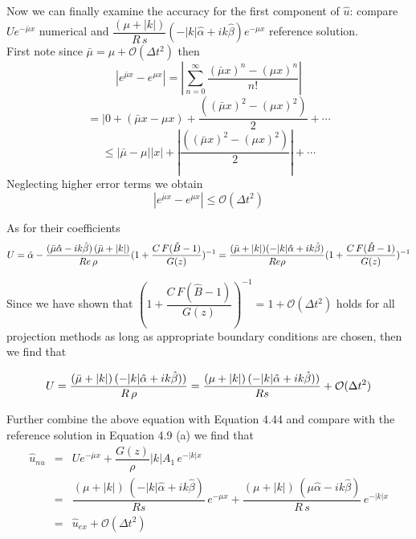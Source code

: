 Now we can finally examine the accuracy for the first component of $\hat{u}$: compare 
$U e^{-\bar{\mu} x}$ numerical and $\dfrac{(\mu + |k|)}{R \,s} (- |k| \hat{\alpha} + ik \hat{\beta}) e^{-\mu x}$ reference solution.\\

First note since $\bar{\mu} = \mu + \mathcal{O} (\Delta t^2)$ then
\begin{equation*}
| e^{\bar{\mu}x} - e^{\mu x} | = | \sum_{n=0}^{\infty} \dfrac{(\bar{\mu} x)^n - (\mu x)^n}{n!} |
\end{equation*}
\begin{equation*}
= | 0 + (\bar{\mu}x - \mu x) + \dfrac{((\bar{\mu} x)^2 - (\mu x)^2)}{2} + \cdots
\end{equation*}
\begin{equation*}
\leq |\bar{\mu} - \mu| |x| + |\dfrac{((\bar{\mu} x)^2 - (\mu x)^2)}{2}| + \cdots
\end{equation*}
Neglecting higher error terms we obtain
\begin{equation*}
| e^{\bar{\mu}x} - e^{\mu x} | \leq \mathcal{O} (\Delta t^2)
\end{equation*}

As for their coefficients\\
\begin{equation*}
U = \hat{\alpha} - \dfrac{(\bar{\mu} \hat{\alpha} - ik \hat{\beta}) \, (\bar{\mu} + |k|)}{Re \, \rho} (1 + \dfrac{C\,F(\hat{B} - 1)}{G(z)})^{-1}
=\\
\dfrac{(\bar{\mu} + |k|) (-|k| \hat{\alpha} + ik \hat{\beta})}{Re \rho} (1 + \dfrac{C\,F(\hat{B} - 1)}{G(z)})^{-1}
\end{equation*}

Since we have shown that $(1 + \dfrac{C\,F(\hat{B} - 1)}{G(z)})^{-1} = 1 + \mathcal{O}(\Delta t^2)$ holds for all projection methods as long as appropriate boundary conditions are chosen, then we find that

\begin{equation}
U = \dfrac{(\bar{\mu} + |k|)\,(- |k|\hat{\alpha}+ik\hat{\beta}))}{R\,\rho} = \\
\dfrac{(\mu+|k|)\,(- |k|\hat{\alpha}+ik\hat{\beta}))}{Rs}+\mathcal{O}(\Delta t^2)
\end{equation}

Further combine the above equation with Equation 4.44 and compare with the reference solution in Equation 4.9 (a) we find that
\begin{eqnarray*}
\hat{u}_{nu} &=& U e^{-\bar{\mu}x} + \dfrac{G(z)}{\rho}|k|A_1\,e^{-|k|x} \\
&=& \dfrac{(\mu+|k|)\,(-|k|\hat{\alpha}+ik\hat{\beta})}{Rs}\,e^{-\mu x} + \dfrac{(\mu+|k|)\,(\mu \hat{\alpha} - ik\hat{\beta})}{R\,s}\,e^{-|k|x} \\
&=&
\hat{u}_{ex} + \mathcal{O} (\Delta t^2)
\end{eqnarray*}

